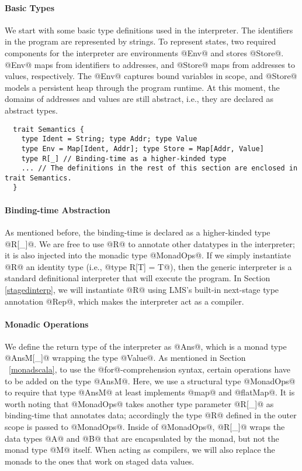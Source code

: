 \paragraph{Basic Types} We start with some basic type definitions used in the
interpreter. The identifiers in the program are represented by
strings. To represent states, two required components for the
interpreter are environments @Env@ and stores @Store@. @Env@ maps from
identifiers to addresses, and @Store@ maps from addresses to values,
respectively. The @Env@ captures bound variables in scope, and @Store@
models a persistent heap through the program runtime.  At this moment,
the domains of addresses and values are still abstract, i.e., they are
declared as abstract types.

\begin{lstlisting}
  trait Semantics {
    type Ident = String; type Addr; type Value
    type Env = Map[Ident, Addr]; type Store = Map[Addr, Value]
    type R[_] // Binding-time as a higher-kinded type
    ... // The definitions in the rest of this section are enclosed in trait Semantics.
  }
\end{lstlisting}

\paragraph{Binding-time Abstraction} As mentioned before, the binding-time is
declared as a higher-kinded type @R[_]@. We are free to use @R@ to annotate
other datatypes in the interpreter; it is also injected into the monadic
type @MonadOps@.
If we simply instantiate @R@ an identity type (i.e., @type R[T] = T@),
then the generic interpreter is a standard definitional interpreter
that will execute the program.  In Section \ref{stagedinterp}, we will
instantiate @R@ using LMS's built-in next-stage type annotation @Rep@,
which makes the interpreter act as a compiler.

\paragraph{Monadic Operations} We define the return type of the interpreter as
@Ans@, which is a monad type @AnsM[_]@ wrapping the type @Value@. 
As mentioned in Section ~\ref{monadscala}, to use the @for@-comprehension
syntax, certain operations have to be added on the type @AnsM@. Here, we use a
structural type @MonadOps@ to require that type @AnsM@ at least implements @map@ and
@flatMap@. It is worth noting that @MonadOps@ takes another type parameter
@R[_]@ as binding-time that annotates data; accordingly the type @R@
defined in the outer scope is passed to @MonadOps@. Inside of @MonadOps@,
@R[_]@ wraps the data types @A@ and @B@ that are encapsulated by the
monad, but not the monad type @M@ itself. When acting as compilers, we
will also replace the monads to the ones that work on staged data values.

